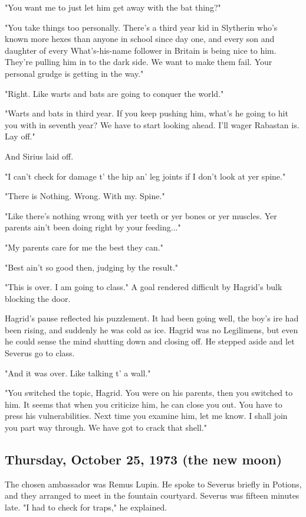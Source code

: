 "You want me to just let him get away with the bat thing?"

"You take things too personally. There's a third year kid in Slytherin who's known more hexes than anyone in school since day one, and every son and daughter of every What's-his-name follower in Britain is being nice to him. They're pulling him in to the dark side. We want to make them fail. Your personal grudge is getting in the way."

"Right. Like warts and bats are going to conquer the world."

"Warts and bats in third year. If you keep pushing him, what's he going to hit you with in seventh year? We have to start looking ahead. I'll wager Rabastan is. Lay off."

And Sirius laid off.

"I can't check for damage t' the hip an' leg joints if I don't look at yer spine."

"There is Nothing. Wrong. With my. Spine."

"Like there's nothing wrong with yer teeth or yer bones or yer muscles. Yer parents ain't been doing right by your feeding..."

"My parents care for me the best they can."

"Best ain't so good then, judging by the result."

"This is over. I am going to class." A goal rendered difficult by Hagrid's bulk blocking the door.

Hagrid's pause reflected his puzzlement. It had been going well, the boy's ire had been rising, and suddenly he was cold as ice. Hagrid was no Legilimens, but even he could sense the mind shutting down and closing off. He stepped aside and let Severus go to class.

"And it was over. Like talking t' a wall."

"You switched the topic, Hagrid. You were on his parents, then you switched to him. It seems that when you criticize him, he can close you out. You have to press his vulnerabilities. Next time you examine him, let me know. I shall join you part way through. We have got to crack that shell."

\subsection{Thursday, October 25, 1973 (the new moon)}

The chosen ambassador was Remus Lupin. He spoke to Severus briefly in Potions, and they arranged to meet in the fountain courtyard. Severus was fifteen minutes late. "I had to check for traps," he explained.

